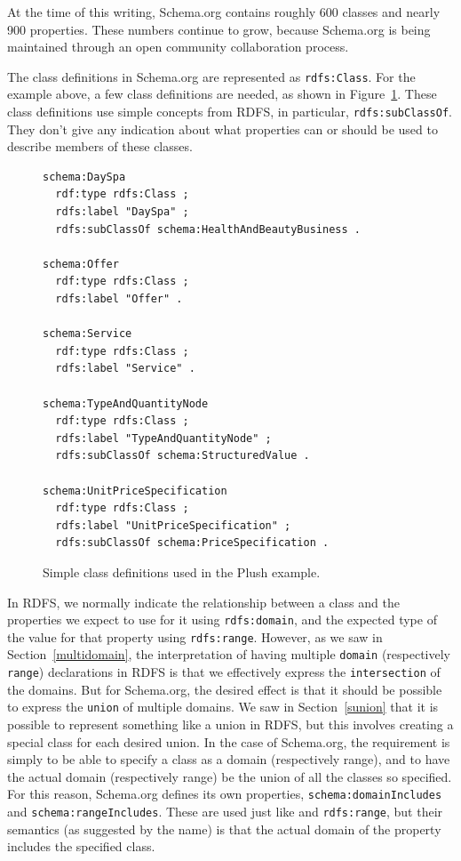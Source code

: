 At the time of this writing, Schema.org contains roughly 600 classes and nearly 
900 properties.  These numbers continue to grow, because Schema.org is being
maintained through an open community collaboration process. 

The class definitions in Schema.org are represented as \texttt{rdfs:Class}.  
For the 
example above, a few class definitions are needed, as shown in Figure~\ref{fig:ch10.s.o.def}.  These class definitions use simple concepts from RDFS, in particular, 
\texttt{rdfs:subClassOf}.  They don't give any indication about what
properties can or should be used to describe members of these classes. 


\begin{figure}
\begin{lstlisting}
schema:DaySpa
  rdf:type rdfs:Class ;
  rdfs:label "DaySpa" ;
  rdfs:subClassOf schema:HealthAndBeautyBusiness .

schema:Offer
  rdf:type rdfs:Class ;
  rdfs:label "Offer" .
  
schema:Service
  rdf:type rdfs:Class ;
  rdfs:label "Service" .
  
schema:TypeAndQuantityNode
  rdf:type rdfs:Class ;
  rdfs:label "TypeAndQuantityNode" ;
  rdfs:subClassOf schema:StructuredValue .

schema:UnitPriceSpecification
  rdf:type rdfs:Class ;
  rdfs:label "UnitPriceSpecification" ;
  rdfs:subClassOf schema:PriceSpecification .
\end{lstlisting} 

    \caption{Simple class definitions used in the Plush example. }
    \label{fig:ch10.s.o.def}
\end{figure}

In RDFS, we normally indicate the relationship between a class and the properties
we expect to use for it using \texttt{rdfs:domain}, and the expected 
type of the value for that property using \texttt{rdfs:range}.  However, as we 
saw in Section~\ref{multidomain}, the interpretation of having multiple 
\texttt{domain} (respectively \texttt{range}) declarations in RDFS is that 
we effectively express the \texttt{intersection} of the domains.  But for 
Schema.org, the desired effect is that it should be possible to express the 
\texttt{union} of multiple domains.  We saw in Section~\ref{sunion} that it is 
possible to represent something like a union in RDFS, but this involves
creating a special class for each desired union.  In the case of Schema.org, 
the requirement is simply to be able to specify a class as a domain (respectively 
range), and to have the actual domain (respectively range) be the union of all 
the classes so specified.  For this reason, Schema.org defines its own 
properties, \texttt{schema:domainIncludes} and \texttt{schema:rangeIncludes}. 
These are used just like  and \texttt{rdfs:range}, but 
their semantics (as suggested by the name) is that the actual domain of 
the property includes the specified class. 

